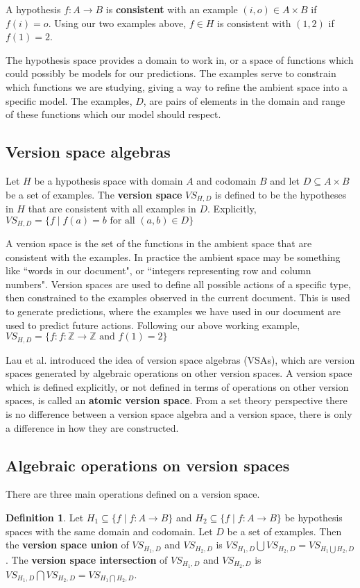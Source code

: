 \documentclass{article}
\theoremstyle{definition}
\newtheorem{definition}{Definition}[section]
\begin{document}
A hypothesis $f: A\rightarrow B$ is \textbf{consistent} with an example $(i,o) \in A\times B$ if $f(i) = o$. Using our two examples above, $f\in H $ is consistent with $(1,2)$ if $f(1) = 2$. 

The hypothesis space provides a domain to work in, or a space of functions which could possibly be models for our predictions. The examples serve to constrain which functions we are studying, giving a way to refine the ambient space into a specific model.  The examples, $D$, are pairs of elements in the domain and range of these functions which our model should respect. 


\subsection{Version space algebras}
Let $H$ be a hypothesis space with domain $A$ and codomain $B$ and let $D \subseteq A \times B$ be a set of examples. The \textbf{version space} $VS_{H,D}$ is defined to be the hypotheses in $H$ that are consistent with all examples in $D$. Explicitly, $VS_{H,D} = \{f \mid f(a) = b \text{ for all } (a,b) \in D\}$

A version space is the set of the functions in the ambient space that are consistent with the examples. In practice the ambient space may be something like ``words in our document", or ``integers representing row and column numbers".  Version spaces are used to define all possible actions of a specific type, then constrained to the examples observed in the current document. This is used to generate predictions, where the examples we have used in our document are used to predict future actions.
Following our above working example, $VS_{H,D} = \{f : f: \mathbb{Z} \rightarrow \mathbb{Z} \text{ and } f(1) = 2\}$

Lau et al.\cite{short} introduced the idea of version space algebras (VSAs), which are version spaces generated by algebraic operations on other version spaces. A version space which is defined explicitly, or not defined in terms of operations on other version spaces, is called an \textbf{atomic version space}. From a set theory perspective there is no difference between a version space algebra and a version space, there is only a difference in how they are constructed. 

\subsection{Algebraic operations on version spaces}
There are three main operations defined on a version space. 
\begin{definition}
    Let $H_1 \subseteq \{f \mid f: A \rightarrow B\}$ and $H_2 \subseteq \{f \mid f: A \rightarrow B\}$ be hypothesis spaces with the same domain and codomain. Let $D$ be a set of examples. Then the \textbf{version space union} of $VS_{H_1, D}$ and $VS_{H_2, D}$ is $VS_{H_1, D} \bigcup VS_{H_2, D} = VS_{H_1\bigcup H_2, D}$. The \textbf{version space intersection} of $VS_{H_1, D}$ and $VS_{H_2, D}$ is $VS_{H_1, D} \bigcap VS_{H_2, D} = VS_{H_1\bigcap H_2, D}$.
\end{definition}
\end{document}
